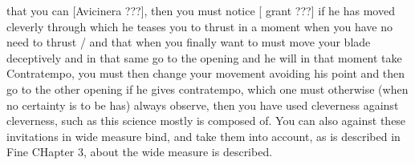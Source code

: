 \newpage


\newpage


that you can [Avicinera ???], then you must notice [ grant ???] if he
has moved cleverly through which he teases you to thrust in a moment
when you have no need to thrust / and that when you finally want to
must move your blade deceptively and in that same go to the opening
and he will in that moment take Contratempo, you must then change your
movement avoiding his point and then go to the other opening if he
gives contratempo, which one must otherwise (when no certainty is to be
has) always observe, then you have used cleverness against cleverness,
such as this science mostly is composed of. You can also against these
invitations in wide measure bind, and take them into account, as is
described in Fine CHapter 3, about the wide measure is described.


